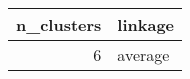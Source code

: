 \begin{tabular}{rl}
\toprule
n_clusters & linkage \\
\midrule
6 & average \\
\bottomrule
\end{tabular}
